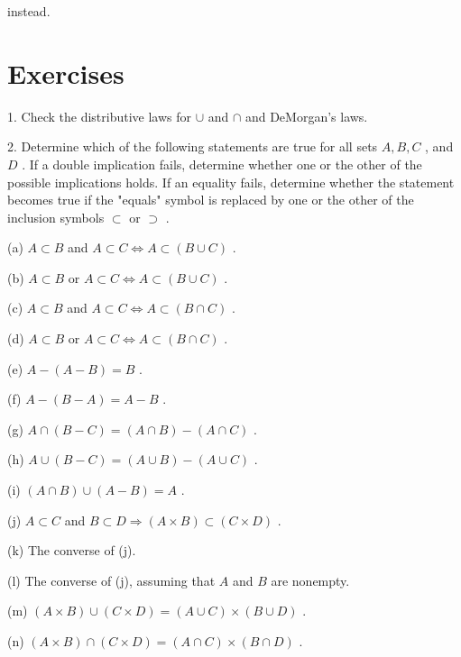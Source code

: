 \documentclass[10pt]{article}
\begin{document}
instead.

\section*{Exercises}

1. Check the distributive laws for \(\cup\) and \(\cap\) and DeMorgan’s laws.

2. Determine which of the following statements are true for all sets \(A,B,C\) , and \(D\) . If a double implication fails, determine whether one or the other of the possible implications holds. If an equality fails, determine whether the statement becomes true if the "equals" symbol is replaced by one or the other of the inclusion symbols \(\subset\) or \(\supset\) .

(a) \(A \subset  B\) and \(A \subset  C \Leftrightarrow  A \subset  \left( {B \cup  C}\right)\) .

(b) \(A \subset  B\) or \(A \subset  C \Leftrightarrow  A \subset  \left( {B \cup  C}\right)\) .

(c) \(A \subset  B\) and \(A \subset  C \Leftrightarrow  A \subset  \left( {B \cap  C}\right)\) .

(d) \(A \subset  B\) or \(A \subset  C \Leftrightarrow  A \subset  \left( {B \cap  C}\right)\) .

(e) \(A - \left( {A - B}\right)  = B\) .

(f) \(A - \left( {B - A}\right)  = A - B\) .

(g) \(A \cap  \left( {B - C}\right)  = \left( {A \cap  B}\right)  - \left( {A \cap  C}\right)\) .

(h) \(A \cup  \left( {B - C}\right)  = \left( {A \cup  B}\right)  - \left( {A \cup  C}\right)\) .

(i) \(\left( {A \cap  B}\right)  \cup  \left( {A - B}\right)  = A\) .

(j) \(A \subset  C\) and \(B \subset  D \Rightarrow  \left( {A \times  B}\right)  \subset  \left( {C \times  D}\right)\) .

(k) The converse of (j).

(l) The converse of (j), assuming that \(A\) and \(B\) are nonempty.

(m) \(\left( {A \times  B}\right)  \cup  \left( {C \times  D}\right)  = \left( {A \cup  C}\right)  \times  \left( {B \cup  D}\right)\) .

(n) \(\left( {A \times  B}\right)  \cap  \left( {C \times  D}\right)  = \left( {A \cap  C}\right)  \times  \left( {B \cap  D}\right)\) .
\end{document}
